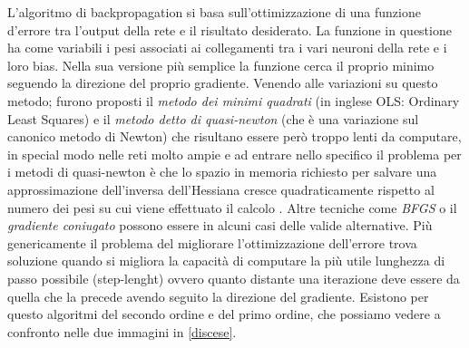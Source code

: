 L'algoritmo di backpropagation si basa sull'ottimizzazione di una funzione d'errore tra l'output della rete e il risultato desiderato. La funzione in questione ha come variabili i pesi associati ai collegamenti tra i vari neuroni della rete e i loro bias. Nella sua versione più semplice la funzione cerca il proprio minimo seguendo la direzione del proprio gradiente.
Venendo alle variazioni su questo metodo; furono proposti il \textit{metodo dei minimi quadrati} (in inglese OLS: Ordinary Least Squares) e il \textit{metodo detto di quasi-newton} (che è una variazione sul canonico metodo di Newton) che risultano essere però troppo lenti da computare, in special modo nelle reti molto ampie e ad entrare nello specifico il problema per i metodi di quasi-newton è che lo spazio in memoria richiesto per salvare una approssimazione dell'inversa dell'Hessiana cresce quadraticamente rispetto al numero dei pesi su cui viene effettuato il calcolo \cite{saito1997partial}. Altre tecniche come \textit{BFGS} o il \textit{gradiente coniugato} possono essere in alcuni casi delle valide alternative.
Più genericamente il problema del migliorare l'ottimizzazione dell'errore trova soluzione quando si migliora la capacità di computare la più utile lunghezza di passo possibile (step-lenght) ovvero quanto distante una iterazione deve essere da quella che la precede avendo seguito la direzione del gradiente.
Esistono per questo algoritmi del secondo ordine e del primo ordine, che possiamo vedere a confronto nelle due immagini in \ref{discese}.



